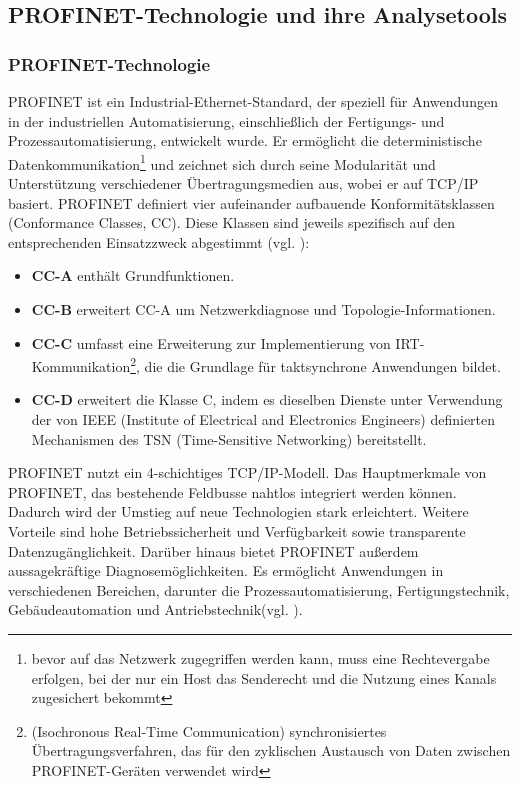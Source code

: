 \subsection{PROFINET-Technologie und ihre Analysetools}
\subsubsection{PROFINET-Technologie}

PROFINET ist ein Industrial-Ethernet-Standard, der speziell für Anwendungen in der industriellen Automatisierung, einschließlich der Fertigungs- und Prozessautomatisierung, entwickelt wurde. Er ermöglicht die deterministische Datenkommunikation\footnote{bevor auf das Netzwerk zugegriffen werden kann, muss eine Rechtevergabe erfolgen, bei der nur ein Host das Senderecht und die Nutzung eines Kanals zugesichert bekommt} und zeichnet sich durch seine Modularität und Unterstützung verschiedener Übertragungsmedien aus, wobei er auf TCP/IP basiert. PROFINET definiert vier aufeinander aufbauende Konformitätsklassen (Conformance Classes, CC). Diese Klassen sind jeweils spezifisch auf den entsprechenden Einsatzzweck abgestimmt (vgl. \cite{IPInsider}):

\begin{itemize}
\item \textbf{CC-A} enthält Grundfunktionen.
\item \textbf{CC-B} erweitert CC-A um Netzwerkdiagnose und Topologie-Informationen.
\item \textbf{CC-C} umfasst eine Erweiterung zur Implementierung von IRT-Kommunikation\footnote{(Isochronous Real-Time Communication) synchronisiertes Übertragungsverfahren, das für den zyklischen Austausch von Daten zwischen PROFINET-Geräten verwendet wird}, die die Grundlage für taktsynchrone Anwendungen bildet.
\item \textbf{CC-D} erweitert die Klasse C, indem es dieselben Dienste unter Verwendung der von IEEE (Institute of Electrical and Electronics Engineers) definierten Mechanismen des TSN (Time-Sensitive Networking) bereitstellt.
\end{itemize} PROFINET nutzt ein 4-schichtiges TCP/IP-Modell. Das Hauptmerkmale von PROFINET, das bestehende Feldbusse nahtlos integriert werden können. Dadurch wird der Umstieg auf neue Technologien stark erleichtert. Weitere Vorteile sind hohe Betriebssicherheit und Verfügbarkeit sowie transparente Datenzugänglichkeit. Darüber hinaus bietet PROFINET außerdem aussagekräftige Diagnosemöglichkeiten. Es ermöglicht Anwendungen in verschiedenen Bereichen, darunter die Prozessautomatisierung, Fertigungstechnik, Gebäudeautomation und Antriebstechnik(vgl. \cite{fluke}).




